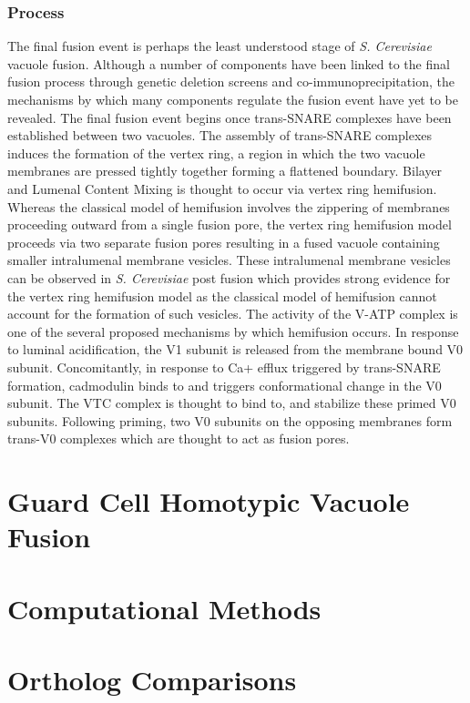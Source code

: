 \documentclass[12pt,twoside]{reedthesis}
\begin{document}
\subsection{Process}\label{process-2}

The final fusion event is perhaps the least understood stage of \emph{S. Cerevisiae} vacuole fusion. Although a number of components have been linked to the final fusion process through genetic deletion screens and co-immunoprecipitation, the mechanisms by which many components regulate the fusion event have yet to be revealed. The final fusion event begins once trans-SNARE complexes have been established between two vacuoles. The assembly of trans-SNARE complexes induces the formation of the vertex ring, a region in which the two vacuole membranes are pressed tightly together forming a flattened boundary. Bilayer and Lumenal Content Mixing is thought to occur via vertex ring hemifusion. Whereas the classical model of hemifusion involves the zippering of membranes proceeding outward from a single fusion pore, the vertex ring hemifusion model proceeds via two separate fusion pores resulting in a fused vacuole containing smaller intralumenal membrane vesicles. These intralumenal membrane vesicles can be observed in \emph{S. Cerevisiae} post fusion which provides strong evidence for the vertex ring hemifusion model as the classical model of hemifusion cannot account for the formation of such vesicles. The activity of the V-ATP complex is one of the several proposed mechanisms by which hemifusion occurs. In response to luminal acidification, the V1 subunit is released from the membrane bound V0 subunit. Concomitantly, in response to Ca+ efflux triggered by trans-SNARE formation, cadmodulin binds to and triggers conformational change in the V0 subunit. The VTC complex is thought to bind to, and stabilize these primed V0 subunits. Following priming, two V0 subunits on the opposing membranes form trans-V0 complexes which are thought to act as fusion pores.

\chapter{Guard Cell Homotypic Vacuole Fusion}\label{GuardFusion}

\chapter{Computational Methods}\label{CompMethods}

\chapter{Ortholog Comparisons}\label{OrthoComp}
\end{document}
